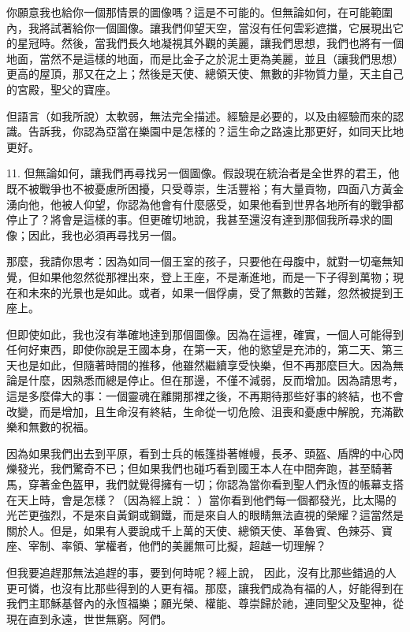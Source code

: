你願意我也給你一個那情景的圖像嗎？這是不可能的。但無論如何，在可能範圍內，我將試著給你一個圖像。讓我們仰望天空，當沒有任何雲彩遮擋，它展現出它的星冠時。然後，當我們長久地凝視其外觀的美麗，讓我們思想，我們也將有一個地面，當然不是這樣的地面，而是比金子之於泥土更為美麗，並且（讓我們思想）更高的屋頂，那又在之上；然後是天使、總領天使、無數的非物質力量，天主自己的宮殿，聖父的寶座。\par

但語言（如我所說）太軟弱，無法完全描述。經驗是必要的，以及由經驗而來的認識。告訴我，你認為亞當在樂園中是怎樣的？這生命之路遠比那更好，如同天比地更好。\par

11. 但無論如何，讓我們再尋找另一個圖像。假設現在統治者是全世界的君王，他既不被戰爭也不被憂慮所困擾，只受尊崇，生活豐裕；有大量貢物，四面八方黃金湧向他，他被人仰望，你認為他會有什麼感受，如果他看到世界各地所有的戰爭都停止了？將會是這樣的事。但更確切地說，我甚至還沒有達到那個我所尋求的圖像；因此，我也必須再尋找另一個。\par

那麼，我請你思考：因為如同一個王室的孩子，只要他在母腹中，就對一切毫無知覺，但如果他忽然從那裡出來，登上王座，不是漸進地，而是一下子得到萬物；現在和未來的光景也是如此。或者，如果一個俘虜，受了無數的苦難，忽然被提到王座上。\par

但即使如此，我也沒有準確地達到那個圖像。因為在這裡，確實，一個人可能得到任何好東西，即使你說是王國本身，在第一天，他的慾望是充沛的，第二天、第三天也是如此，但隨著時間的推移，他雖然繼續享受快樂，但不再那麼巨大。因為無論是什麼，因熟悉而總是停止。但在那邊，不僅不減弱，反而增加。因為請思考，這是多麼偉大的事：一個靈魂在離開那裡之後，不再期待那些好事的終結，也不會改變，而是增加，且生命沒有終結，生命從一切危險、沮喪和憂慮中解脫，充滿歡樂和無數的祝福。\par

因為如果我們出去到平原，看到士兵的帳篷掛著帷幔，長矛、頭盔、盾牌的中心閃爍發光，我們驚奇不已；但如果我們也碰巧看到國王本人在中間奔跑，甚至騎著馬，穿著金色盔甲，我們就覺得擁有一切；你認為當你看到聖人們永恆的帳幕支搭在天上時，會是怎樣？（因為經上說： ）當你看到他們每一個都發光，比太陽的光芒更強烈，不是來自黃銅或鋼鐵，而是來自人的眼睛無法直視的榮耀？這當然是關於人。但是，如果有人要說成千上萬的天使、總領天使、革魯賓、色辣芬、寶座、宰制、率領、掌權者，他們的美麗無可比擬，超越一切理解？\par

但我要追趕那無法追趕的事，要到何時呢？經上說，  因此，沒有比那些錯過的人更可憐，也沒有比那些得到的人更有福。那麼，讓我們成為有福的人，好能得到在我們主耶穌基督內的永恆福樂；願光榮、權能、尊崇歸於祂，連同聖父及聖神，從現在直到永遠，世世無窮。阿們。\par


